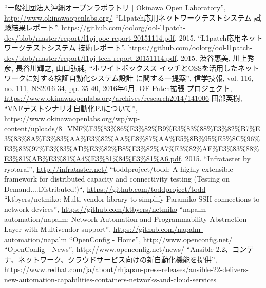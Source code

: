 
\begin{thebibliography}{99}
         ``一般社団法人沖縄オープンラボラトリ | Okinawa Open Laboratory'',
         \url{http://www.okinawaopenlabs.org/}
         ``L1patch応用ネットワークテストシステム 試験結果レポート''.
         \url{https://github.com/oolorg/ool-l1patch-dev/blob/master/report/l1pj-poc-report-20151114.pdf}.
         2015.
         ``L1patch応用ネットワークテストシステム 技術レポート''.
         \url{https://github.com/oolorg/ool-l1patch-dev/blob/master/report/l1pj-tech-report-20151114.pdf}.
         2015.
         渋谷惠美, 川上秀彦, 長谷川輝之, 山口弘純, ``ホワイトボックスス
         イッチとOSSを活用したネットワークに対する検証自動化システム設計
         に関する一提案'', 信学技報, vol. 116, no. 111, NS2016-34,
         pp. 35-40, 2016年6月.
         OF-Patch拡張 プロジェクト,
         \url{https://www.okinawaopenlabs.org/archives/research2014/141006}
         田部英樹, ``VNFテストシナリオ自動化PJについて'',
         \url{https://www.okinawaopenlabs.org/wp/wp-content/uploads/8_VNF%E3%83%86%E3%82%B9%E3%83%88%E3%82%B7%E3%83%8A%E3%83%AA%E3%82%AA%E8%87%AA%E5%8B%95%E5%8C%96%E3%83%97%E3%83%AD%E3%82%B8%E3%82%A7%E3%82%AF%E3%83%88%E3%81%AB%E3%81%A4%E3%81%84%E3%81%A6.pdf}, 2015.
         ``Infrataster by ryotarai'',
         \url{http://infrataster.net/}
         ``toddproject/todd: A highly extensible framework for distributed capacity and connectivity testing (Testing on Demand....Distributed!)``,
         \url{https://github.com/toddproject/todd}
         ``ktbyers/netmiko: Multi-vendor library to simplify Paramiko SSH connections to network devices'',
         \url{https://github.com/ktbyers/netmiko}
         ``napalm-automation/napalm: Network Automation and Programmability Abstraction Layer with Multivendor support'',
         \url{https://github.com/napalm-automation/napalm}
         ``OpenConfig - Home'',
         \url{http://www.openconfig.net/}
         ``OpenConfig - News'',
         \url{http://www.openconfig.net/news/}
         ``Ansible 2.2、コンテナ、ネットワーク、クラウドサービス向けの新自動化機能を提供'',
         \url{https://www.redhat.com/ja/about/rhjapan-press-releases/ansible-22-delivers-new-automation-capabilities-containers-networks-and-cloud-services}

\end{thebibliography}

